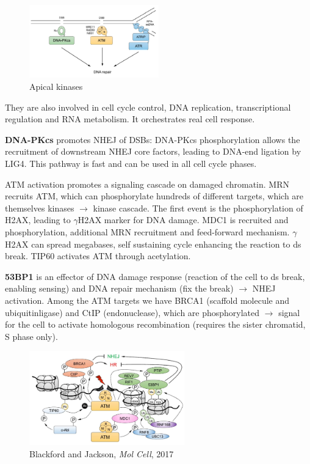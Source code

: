 \begin{figure}
\centering
\includegraphics[width=0.5\textwidth]{../_resources/Screen_Shot_2022-11-30_at_09-11-05.png}
\caption{Apical kinases}
\label{fig:apical}
\end{figure}

They are also involved in cell cycle control, DNA replication, transcriptional regulation and RNA metabolism. It orchestrates real cell response.

\textbf{DNA-PKcs} promotes NHEJ of DSBs: DNA-PKcs phosphorylation allows the recruitment of downstream NHEJ core factors, leading to DNA-end ligation by LIG4. This pathway is fast and can be used in all cell cycle phases.

ATM activation promotes a signaling cascade on damaged chromatin. MRN recruits ATM, which can phosphorylate hundreds of different targets, which are themselves kinases $\rightarrow$ kinase cascade. The first event is the phosphorylation of H2AX, leading to $\gamma$H2AX marker for DNA damage. MDC1 is recruited and phosphorylation, additional MRN recruitment and feed-forward mechanism. $\gamma$H2AX can spread megabases, self sustaining cycle enhancing the reaction to ds break. TIP60 activates ATM through acetylation.

\textbf{53BP1} is an effector of DNA damage response (reaction of the cell to ds break, enabling sensing) and DNA repair mechanism (fix the break) $\rightarrow$ NHEJ activation. Among the ATM targets we have BRCA1 (scaffold molecule and ubiquitinligase) and CtIP (endonuclease), which are phosphorylated $\rightarrow$ signal for the cell to activate homologous recombination (requires the sister chromatid, S phase only).

\begin{figure}
\centering
\includegraphics[width=0.6\textwidth]{../_resources/Screen_Shot_2022-11-30_at_09-16-55.png}
\caption{Blackford and Jackson, \emph{Mol Cell}, 2017}
\end{figure}

